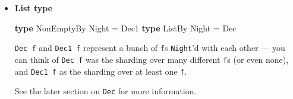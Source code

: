 \documentclass[]{article}
\newenvironment{Shaded}{}{}
\newcommand{\CommentTok}[1]{\textcolor[rgb]{0.38,0.63,0.69}{\textit{#1}}}
\newcommand{\DataTypeTok}[1]{\textcolor[rgb]{0.56,0.13,0.00}{#1}}
\newcommand{\KeywordTok}[1]{\textcolor[rgb]{0.00,0.44,0.13}{\textbf{#1}}}
\newcommand{\NormalTok}[1]{#1}
\newcommand{\OtherTok}[1]{\textcolor[rgb]{0.00,0.44,0.13}{#1}}
\renewcommand{\href}[2]{#2\footnote{\url{#1}}}
\begin{document}
\begin{itemize}
  \texttt{Decide} from
  \emph{\href{https://hackage.haskell.org/package/contravariant/docs/Data-Functor-Contravariant-Decide.html}{Data.Functor.Contravariant.Decide}}
  can be thought of as a deterministic sharding typeclass: You can combine two
  consumers along with a decision function on which consumer to use.

\begin{Shaded}
\begin{Highlighting}[]
\KeywordTok{class} \DataTypeTok{Contravariant}\NormalTok{ f }\OtherTok{=\textgreater{}} \DataTypeTok{Decide}\NormalTok{ f }\KeywordTok{where}
\OtherTok{    decide ::}\NormalTok{ (a }\OtherTok{{-}\textgreater{}} \DataTypeTok{Either}\NormalTok{ b c) }\OtherTok{{-}\textgreater{}}\NormalTok{ f b }\OtherTok{{-}\textgreater{}}\NormalTok{ f c }\OtherTok{{-}\textgreater{}}\NormalTok{ f a}
                        \CommentTok{{-}{-} \^{} use the f b}
                          \CommentTok{{-}{-} \^{} use the f c}
\end{Highlighting}
\end{Shaded}

  \texttt{Conclude} from
  \emph{\href{https://hackage.haskell.org/package/functor-combinators/docs/Data-Functor-Contravariant-Conclude.html}{Data.Functor.Contravariant.Conclude}},
  adds support for specifying an \texttt{f} that cannot be chosen by the
  decision function when used with \texttt{decide}.

\begin{Shaded}
\begin{Highlighting}[]
\KeywordTok{class} \DataTypeTok{Decide}\NormalTok{ f }\OtherTok{=\textgreater{}} \DataTypeTok{Conclude}\NormalTok{ f }\KeywordTok{where}
\OtherTok{    conclude ::}\NormalTok{ (a }\OtherTok{{-}\textgreater{}} \DataTypeTok{Void}\NormalTok{) }\OtherTok{{-}\textgreater{}}\NormalTok{ f a}
\end{Highlighting}
\end{Shaded}
\item
  \textbf{List type}

\begin{Shaded}
\begin{Highlighting}[]
\KeywordTok{type} \DataTypeTok{NonEmptyBy} \DataTypeTok{Night} \OtherTok{=} \DataTypeTok{Dec1}
\KeywordTok{type} \DataTypeTok{ListBy}     \DataTypeTok{Night} \OtherTok{=} \DataTypeTok{Dec}
\end{Highlighting}
\end{Shaded}

  \texttt{Dec\ f} and \texttt{Dec1\ f} represent a bunch of \texttt{f}s
  \texttt{Night}'d with each other --- you can think of \texttt{Dec\ f} was the
  sharding over many different \texttt{f}s (or even none), and \texttt{Dec1\ f}
  as the sharding over at least one \texttt{f}.

  See the later section on \texttt{Dec} for more information.
\end{itemize}
\end{document}

